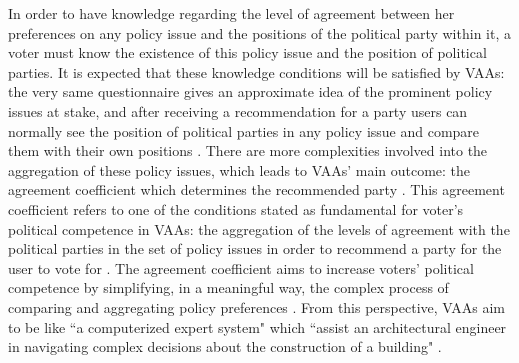 \documentclass{scrartcl}
\begin{document}
In order to have knowledge regarding the level of agreement between her preferences on any policy issue and the positions of the political party within it, a voter must know the existence of this policy issue and the position of political parties. It is expected that these knowledge conditions will be satisfied by VAAs: the very same questionnaire gives an approximate idea of the prominent policy issues at stake, and after receiving a recommendation for a party users can normally see the position of political parties in any policy issue and compare them with their own positions \cite{Garzia2014}. There are more complexities involved into the aggregation of these policy issues, which leads to VAAs' main outcome: the agreement coefficient which determines the recommended party \cite{louwerse2014design}. This agreement coefficient refers to one of the conditions stated as fundamental for voter's political competence in VAAs: the aggregation of the levels of agreement with the political parties in the set of policy issues in order to recommend a party for the user to vote for \cite{Mendez2017}. The agreement coefficient aims to increase voters' political competence by simplifying, in a meaningful way, the complex process of comparing and aggregating policy preferences \cite{marschall2010impact}. From this perspective, VAAs aim to be like ``a computerized expert system" which ``assist an architectural engineer in navigating complex decisions about the construction of a building" \cite[246]{fossen2014s}. 
\\
\end{document}
